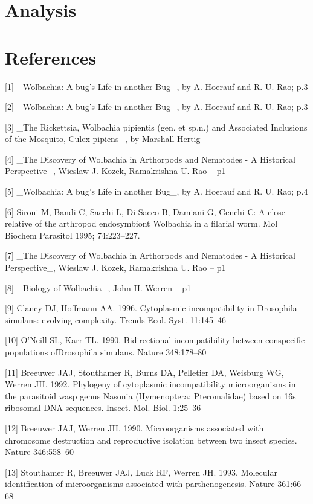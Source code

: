 \documentclass[twocolumn]{article}
\begin{document}
\section*{Analysis}

\section*{References}
[1] \_Wolbachia: A bug's Life in another Bug\_, by A. Hoerauf and R. U. Rao;  p.3 

[2] \_Wolbachia: A bug's Life in another Bug\_, by A. Hoerauf and R. U. Rao;  p.3

[3] \_The Rickettsia, Wolbachia pipientis (gen. et sp.n.) and Associated Inclusions of the Mosquito, Culex pipiens\_, by Marshall Hertig

[4] \_The Discovery of Wolbachia in Arthorpods and Nematodes - A Historical Perspective\_, Wieslaw J. Kozek, Ramakrishna U. Rao  -- p1

[5] \_Wolbachia: A bug's Life in another Bug\_, by A. Hoerauf and R. U. Rao;  p.4

[6] Sironi M, Bandi C, Sacchi L, Di Sacco B, Damiani G, Genchi C: A close relative of the arthropod endosymbiont Wolbachia in a filarial worm. Mol Biochem Parasitol 1995; 74:223–227.

[7] \_The Discovery of Wolbachia in Arthorpods and Nematodes - A Historical Perspective\_, Wieslaw J. Kozek, Ramakrishna U. Rao  -- p1

[8] \_Biology of Wolbachia\_, John H. Werren  -- p1

[9] Clancy DJ, Hoffmann AA. 1996. Cytoplasmic incompatibility in Drosophila simulans: evolving complexity. Trends Ecol. Syst. 11:145–46

[10] O’Neill SL, Karr TL. 1990. Bidirectional incompatibility between conspecific populations ofDrosophila simulans. Nature 348:178–80

[11] Breeuwer JAJ, Stouthamer R, Burns DA, Pelletier DA, Weisburg WG, Werren JH. 1992. Phylogeny of cytoplasmic incompatibility microorganisms in the parasitoid wasp genus Nasonia (Hymenoptera: Pteromalidae) based on 16s ribosomal DNA sequences. Insect. Mol. Biol. 1:25–36

[12] Breeuwer JAJ, Werren JH. 1990. Microorganisms associated with chromosome destruction and reproductive isolation between two insect species. Nature 346:558–60

[13] Stouthamer R, Breeuwer JAJ, Luck RF, Werren JH. 1993. Molecular identification of microorganisms associated with parthenogenesis. Nature 361:66–68 
\end{document}
